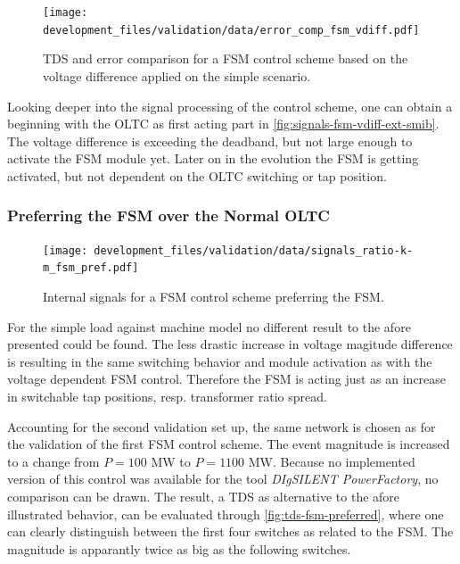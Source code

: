 \begin{figure}[htbp!]
    \centering
    \texttt{[image: development\_files/validation/data/error\_comp\_fsm\_vdiff.pdf]}
    \caption[\acs{TDS} and error comparison for a \acs{FSM} control scheme based on the voltage difference applied on the simple scenario]{\acs{TDS} and error comparison for a \acs{FSM} control scheme based on the voltage difference applied on the simple scenario.}
    \label{fig:error-fsm-vdiff-simple}
\end{figure}

Looking deeper into the signal processing of the control scheme, one can obtain a beginning with the \acs{OLTC} as first acting part in \autoref{fig:signals-fsm-vdiff-ext-smib}.
The voltage difference is exceeding the deadband, but not large enough to activate the \acs{FSM} module yet.
Later on in the evolution the \acs{FSM} is getting activated, but not dependent on the \acs{OLTC} switching or tap position.

\subsubsection{Preferring the FSM over the Normal OLTC}

\begin{figure}[htbp!]
    \centering
    \texttt{[image: development\_files/validation/data/signals\_ratio-k-m\_fsm\_pref.pdf]}
    \caption[Internal signals for a \acs{FSM} control scheme preferring the \acs{FSM}]{Internal signals  for a \acs{FSM} control scheme preferring the \acs{FSM}.}
    \label{fig:signals-fsm-preferred}
\end{figure}

For the simple load against machine model no different result to the afore presented could be found.
The less drastic increase in voltage magitude difference is resulting in the same switching behavior and module activation as with the voltage dependent \acs{FSM} control.
Therefore the \acs{FSM} is acting just as an increase in switchable tap positions, resp. transformer ratio spread.

Accounting for the second validation set up, the same network is chosen as for the validation of the first \acs{FSM} control scheme.
The event magnitude is increased to a change from $P=100\text{ MW}$ to $P=1100\text{ MW}$.
Because no implemented version of this control was available for the tool \textit{DIgSILENT PowerFactory}, no comparison can be drawn.
The result, a \acs{TDS} as alternative to the afore illustrated behavior, can be evaluated through \autoref{fig:tds-fsm-preferred}, where one can clearly distinguish between the first four switches as related to the \acs{FSM}.
The magnitude is apparantly twice as big as the following switches.

